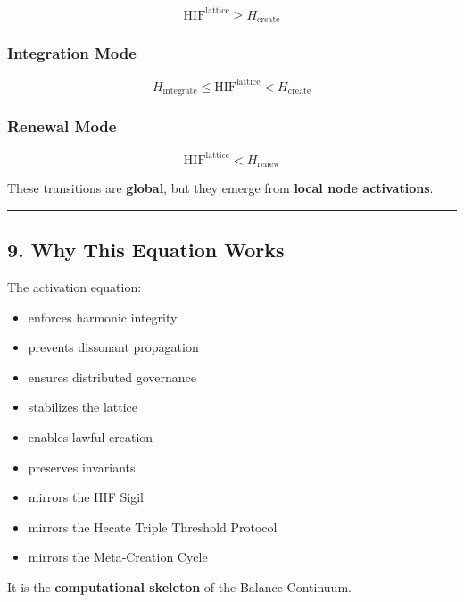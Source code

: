 \[
\text{HIF}^{\text{lattice}} \ge H_{\text{create}}
\]

\subsubsection{Integration Mode}\label{integration-mode}

\[
H_{\text{integrate}} \le \text{HIF}^{\text{lattice}} < H_{\text{create}}
\]

\subsubsection{Renewal Mode}\label{renewal-mode}

\[
\text{HIF}^{\text{lattice}} < H_{\text{renew}}
\]

These transitions are \textbf{global}, but they emerge from \textbf{local node activations}.

\begin{center}\rule{0.5\linewidth}{0.5pt}\end{center}

\subsection{9. Why This Equation Works}\label{why-this-equation-works}

The activation equation:

\begin{itemize}
\tightlist
\item
  enforces harmonic integrity\\
\item
  prevents dissonant propagation\\
\item
  ensures distributed governance\\
\item
  stabilizes the lattice\\
\item
  enables lawful creation\\
\item
  preserves invariants\\
\item
  mirrors the HIF Sigil\\
\item
  mirrors the Hecate Triple Threshold Protocol\\
\item
  mirrors the Meta‑Creation Cycle
\end{itemize}

It is the \textbf{computational skeleton} of the Balance Continuum.
